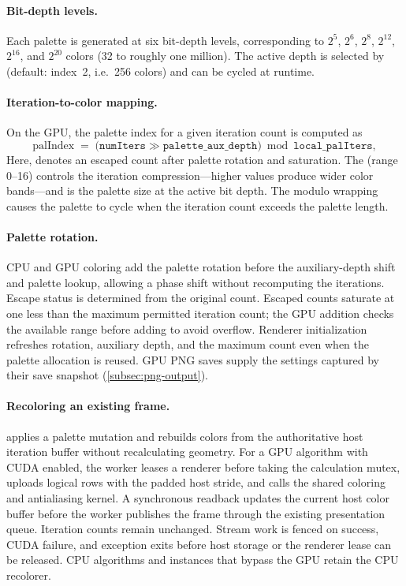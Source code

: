 \paragraph{Bit-depth levels.}
Each palette is generated at six bit-depth levels, corresponding to
$2^5$, $2^6$, $2^8$, $2^{12}$, $2^{16}$, and $2^{20}$ colors
(32 to roughly one million).  The active depth is selected by
 (default: index~2, i.e.\ 256 colors)
and can be cycled at runtime.

\paragraph{Iteration-to-color mapping.}
On the GPU, the palette index for a given iteration count is computed
as
\[
  \mathrm{palIndex} \;=\;
  \bigl(\mathtt{numIters} \gg \mathtt{palette\_aux\_depth}\bigr)
    \bmod \mathtt{local\_palIters},
\]
Here,  denotes an escaped count after palette rotation and
saturation. The  (range 0--16) controls the iteration
compression---higher values produce wider color bands---and
 is the palette size at the active bit depth.
The modulo wrapping causes the palette to cycle when the iteration
count exceeds the palette length.

\paragraph{Palette rotation.}
CPU and GPU coloring add the palette rotation before the auxiliary-depth
shift and palette lookup, allowing a phase shift without recomputing the
iterations. Escape status is determined from the original count. Escaped
counts saturate at one less than the maximum permitted iteration count;
the GPU addition checks the available range before adding to avoid overflow.
Renderer initialization refreshes rotation, auxiliary depth, and the maximum
count even when the palette allocation is reused. GPU PNG saves supply the
settings captured by their save snapshot (\cref{subsec:png-output}).

\paragraph{Recoloring an existing frame.}
 applies a palette mutation and rebuilds colors
from the authoritative host iteration buffer without recalculating geometry.
For a GPU algorithm with CUDA enabled, the worker leases a renderer before
taking the calculation mutex, uploads logical rows with the padded host
stride, and calls the shared coloring and antialiasing kernel. A synchronous
readback updates the current host color buffer before the worker publishes
the frame through the existing presentation queue. Iteration counts remain
unchanged. Stream work is fenced on success, CUDA failure, and exception exits
before host storage or the renderer lease can be released. CPU algorithms and
instances that bypass the GPU retain the CPU recolorer.

